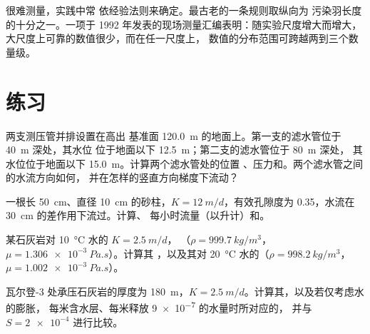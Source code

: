很难测量，实践中常
依经验法则来确定。最古老的一条规则取纵向为
污染羽长度的十分之一。一项于
1992 年发表的现场测量汇编表明：随实验尺度增大而增大，
大尺度上可靠的数值很少，而在任一尺度上，
数值的分布范围可跨越两到三个数量级。

\section{练习}

\begin{exercise}[$\star$]\label{exo:b3:hydrogeology:1}
两支测压管并排设置在高出
基准面 \qty{120.0}{m} 的地面上。第一支的滤水管位于 \qty{40}{m} 深处，其水位
位于地面以下 \qty{12.5}{m}；第二支的滤水管位于 \qty{80}{m} 深处，
其水位位于地面以下 \qty{15.0}{m}。计算两个滤水管处的位置
、压力和。两个滤水管之间的水流方向如何，
并在怎样的竖直方向梯度下流动？
\end{exercise}

\begin{exercise}[$\star$]\label{exo:b3:hydrogeology:2}
一根长 \qty{50}{cm}、直径 \qty{10}{cm} 的砂柱，$K =
\qty{12}{m/d}$，有效孔隙度为 0.35，水流在
\qty{30}{cm} 的差作用下流过。计算、
每小时流量（以升计）和。
\end{exercise}

\begin{exercise}[$\star$]\label{exo:b3:hydrogeology:3}
某石灰岩对 \qty{10}{\celsius} 水的 $K = \qty{2.5}{m/d}$，
（$\rho = \qty{999.7}{kg/m^3}$，$\mu = \qty{1.306e-3}{Pa.s}$）。计算其
，以及其对
\qty{20}{\celsius} 水的（$\rho = \qty{998.2}{kg/m^3}$，$\mu =
\qty{1.002e-3}{Pa.s}$）。
\end{exercise}

\begin{exercise}[$\star$]\label{exo:b3:hydrogeology:4}
瓦尔登-3 处承压石灰岩的厚度为 \qty{180}{m}，$K =
\qty{2.5}{m/d}$。计算其，以及若仅考虑水的膨胀，
每米含水层、每米释放 \num{9e-7} 的水量时所对应的，
并与 $S = \num{2e-4}$ 进行比较。
\end{exercise}

